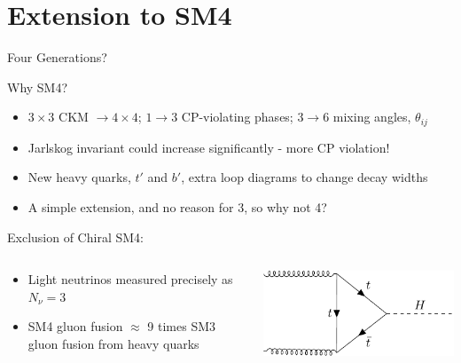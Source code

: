 \documentclass[10pt,xcolor={table,dvipsnames},t]{beamer}
\begin{document}
\section{Extension to SM4}
\begin{frame}{Four Generations?}
    \begin{block}{Why SM4?}
        \begin{itemize}
            \item $3\times3$ CKM $\to4\times4$; $1\to3$ CP-violating phases; $3\to6$ mixing angles, $\theta_{ij}$
            \item Jarlskog invariant could increase significantly - more CP violation!
            \item New heavy quarks, $t'$ and $b'$, extra loop diagrams to change decay widths
            \item A simple extension, and no reason for 3, so why not 4?
        \end{itemize}
    \end{block}
    \begin{block}{Exclusion of Chiral SM4:}
        \begin{columns}[c]
            \begin{column}{0.55\textwidth}
                \begin{itemize}
                    \item Light neutrinos measured precisely as $N_\nu=3$
                    \item SM4 gluon fusion $\approx$ 9 times SM3 gluon fusion from heavy quarks
                \end{itemize}
            \end{column}
            \begin{column}{0.35\textwidth}
                \includegraphics[width=1.1\textwidth]{../notes/higgs.pdf}
            \end{column}
        \end{columns}
    \end{block}
\end{frame}
\end{document}
